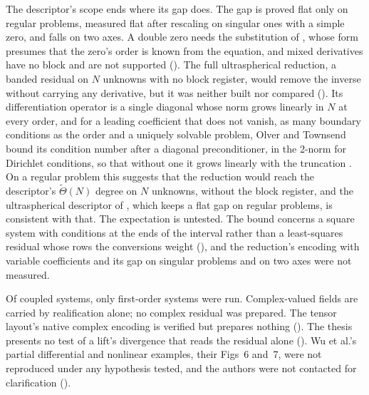 The descriptor's scope ends where its gap does. The gap is proved flat only on regular problems, measured flat after rescaling on singular ones with a simple zero, and falls on two axes. A double zero needs the substitution of , whose form presumes that the zero's order is known from the equation, and mixed derivatives have no block and are not supported (). The full ultraspherical reduction, a banded residual on $N$ unknowns with no block register, would remove the inverse without carrying any derivative, but it was neither built nor compared (). Its differentiation operator is a single diagonal whose norm grows linearly in $N$ at every order, and for a leading coefficient that does not vanish, as many boundary conditions as the order and a uniquely solvable problem, Olver and Townsend bound its condition number after a diagonal preconditioner, in the 2-norm for Dirichlet conditions, so that without one it grows linearly with the truncation \cite{olver2013}. On a regular problem this suggests that the reduction would reach the descriptor's $\tilde\Theta(N)$ degree on $N$ unknowns, without the block register, and the ultraspherical descriptor of , which keeps a flat gap on regular problems, is consistent with that. The expectation is untested. The bound concerns a square system with conditions at the ends of the interval rather than a least-squares residual whose rows the conversions weight (), and the reduction's encoding with variable coefficients and its gap on singular problems and on two axes were not measured.

Of coupled systems, only first-order systems were run. Complex-valued fields are carried by realification alone; no complex residual was prepared. The tensor layout's native complex encoding is verified but prepares nothing (). The thesis presents no test of a lift's divergence that reads the residual alone (). Wu et al.'s partial differential and nonlinear examples, their Figs~6 and~7, were not reproduced under any hypothesis tested, and the authors were not contacted for clarification ().
